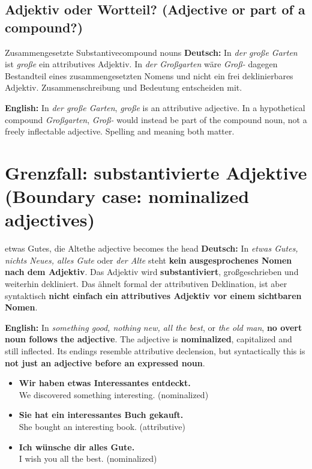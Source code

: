 \documentclass[a4paper,11pt]{article}
\newcommand{\GermanText}[1]{\textbf{Deutsch: }#1\par}
\newcommand{\EnglishText}[1]{{\small\color{SoftGray}\textbf{English: }#1\par}}
\newcommand{\ExampleItem}[2]{\item \textbf{#1}\\{\small\color{SoftGray}#2}}
\begin{document}
\subsection{Adjektiv oder Wortteil? \textnormal{(Adjective or part of a compound?)}}
\begin{grammarentry}{Zusammengesetzte Substantive}{compound nouns}
\GermanText{In \emph{der große Garten} ist \emph{große} ein attributives Adjektiv. In \emph{der Großgarten} wäre \emph{Groß-} dagegen Bestandteil eines zusammengesetzten Nomens und nicht ein frei deklinierbares Adjektiv. Zusammenschreibung und Bedeutung entscheiden mit.}
\EnglishText{In \emph{der große Garten}, \emph{große} is an attributive adjective. In a hypothetical compound \emph{Großgarten}, \emph{Groß-} would instead be part of the compound noun, not a freely inflectable adjective. Spelling and meaning both matter.}
\end{grammarentry}

\section{Grenzfall: substantivierte Adjektive \textnormal{(Boundary case: nominalized adjectives)}}
\begin{grammarentry}{etwas Gutes, die Alte}{the adjective becomes the head}
\GermanText{In \emph{etwas Gutes, nichts Neues, alles Gute} oder \emph{der Alte} steht \textbf{kein ausgesprochenes Nomen nach dem Adjektiv}. Das Adjektiv wird \textbf{substantiviert}, großgeschrieben und weiterhin dekliniert. Das ähnelt formal der attributiven Deklination, ist aber syntaktisch \textbf{nicht einfach ein attributives Adjektiv vor einem sichtbaren Nomen}.}
\EnglishText{In \emph{something good, nothing new, all the best}, or \emph{the old man}, \textbf{no overt noun follows the adjective}. The adjective is \textbf{nominalized}, capitalized and still inflected. Its endings resemble attributive declension, but syntactically this is \textbf{not just an adjective before an expressed noun}.}
\end{grammarentry}
\begin{exbox}\begin{itemize}
\ExampleItem{Wir haben etwas Interessantes entdeckt.}{We discovered something interesting. (nominalized)}
\ExampleItem{Sie hat ein interessantes Buch gekauft.}{She bought an interesting book. (attributive)}
\ExampleItem{Ich wünsche dir alles Gute.}{I wish you all the best. (nominalized)}
\end{itemize}\end{exbox}
\end{document}
